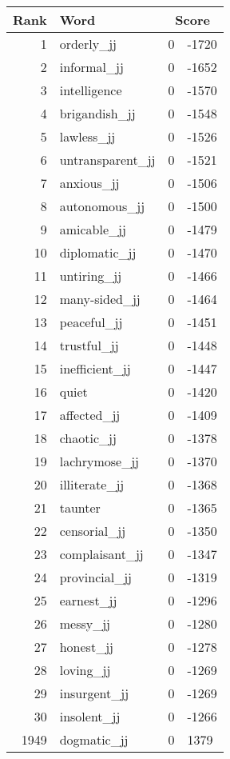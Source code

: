 \begin{longtable}[!htbp]{| rlr@{.}l |}
    \hline
    \textbf{Rank} & \textbf{Word} & \multicolumn{2}{c|}{\textbf{Score}} \\
    \hline
    \endhead
    1 & orderly\_jj & 0 & -1720 \\
    2 & informal\_jj & 0 & -1652 \\
    3 & intelligence & 0 & -1570 \\
    4 & brigandish\_jj & 0 & -1548 \\
    5 & lawless\_jj & 0 & -1526 \\
    6 & untransparent\_jj & 0 & -1521 \\
    7 & anxious\_jj & 0 & -1506 \\
    8 & autonomous\_jj & 0 & -1500 \\
    9 & amicable\_jj & 0 & -1479 \\
    10 & diplomatic\_jj & 0 & -1470 \\
    11 & untiring\_jj & 0 & -1466 \\
    12 & many-sided\_jj & 0 & -1464 \\
    13 & peaceful\_jj & 0 & -1451 \\
    14 & trustful\_jj & 0 & -1448 \\
    15 & inefficient\_jj & 0 & -1447 \\
    16 & quiet & 0 & -1420 \\
    17 & affected\_jj & 0 & -1409 \\
    18 & chaotic\_jj & 0 & -1378 \\
    19 & lachrymose\_jj & 0 & -1370 \\
    20 & illiterate\_jj & 0 & -1368 \\
    21 & taunter & 0 & -1365 \\
    22 & censorial\_jj & 0 & -1350 \\
    23 & complaisant\_jj & 0 & -1347 \\
    24 & provincial\_jj & 0 & -1319 \\
    25 & earnest\_jj & 0 & -1296 \\
    26 & messy\_jj & 0 & -1280 \\
    27 & honest\_jj & 0 & -1278 \\
    28 & loving\_jj & 0 & -1269 \\
    29 & insurgent\_jj & 0 & -1269 \\
    30 & insolent\_jj & 0 & -1266 \\
    1949 & dogmatic\_jj & 0 & 1379 \\

\end{longtable}
